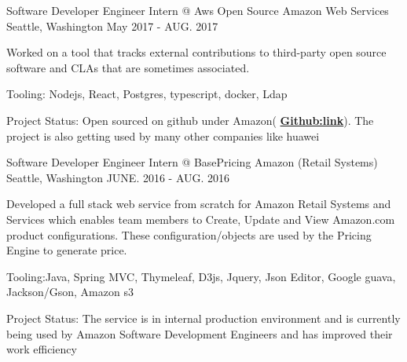 \begin{cventries}
{\begin{cvitems}
      \end{cvitems} 
    }
  \cventry
    {Software Developer Engineer Intern @ Aws Open Source}
    {Amazon Web Services}
    {Seattle, Washington}
    {May 2017 - AUG. 2017}
    {
      \begin{cvitems}
        \item {Worked on a tool that tracks external contributions to third-party open source software and CLAs that are sometimes associated.}
        \item {Tooling: Nodejs, React, Postgres, typescript, docker, Ldap}
        \item {Project Status: Open sourced on github under Amazon( \textbf{\href{https://github.com/amzn/oss-contribution-tracker}{Github:link}}). The project is also getting used by many other companies like huawei}
      \end{cvitems}
    }
  \cventry
    {Software Developer Engineer Intern @ BasePricing}
    {Amazon (Retail Systems)}
    {Seattle, Washington}
    {JUNE. 2016 - AUG. 2016}
    {
      \begin{cvitems}
        \item { Developed a full stack web service from scratch for Amazon Retail Systems and Services which enables team members to Create, Update and View Amazon.com product configurations. These configuration/objects are used by the Pricing Engine to generate price.}
        \item {Tooling:Java, Spring MVC, Thymeleaf, D3js, Jquery, Json Editor, Google guava, Jackson/Gson, Amazon s3}
        \item {Project Status: The service is in internal production environment and is currently being used by Amazon Software Development Engineers and has improved their work efficiency}
      \end{cvitems}
    }
  
\end{cventries}

